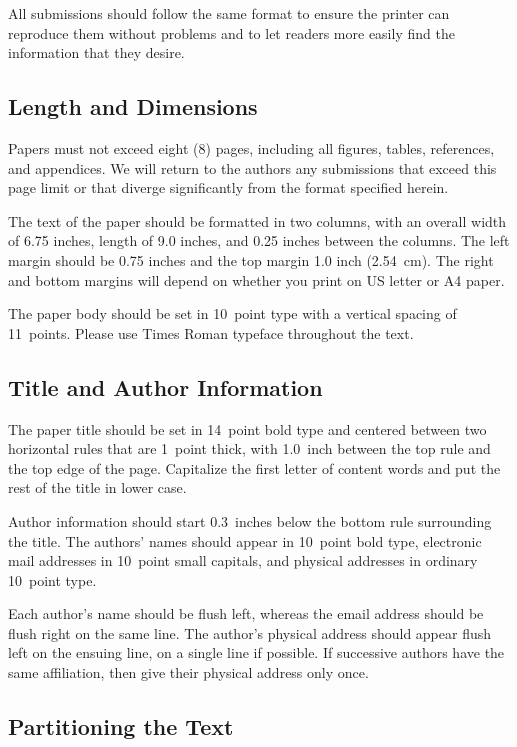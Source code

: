 All submissions should follow the same format to ensure the printer
can reproduce them without problems and to let readers more easily
find the information that they desire. 

\subsection{Length and Dimensions}

Papers must not exceed eight (8) pages, including all figures, tables, 
references, and appendices. We will return to the authors any submissions
that exceed this page limit or that diverge significantly from the format 
specified herein.

The text of the paper should be formatted in two columns, with an
overall width of 6.75 inches, length of 9.0 inches, and 0.25 inches
between the columns. The left margin should be 0.75 inches and the top
margin 1.0 inch (2.54~cm). The right and bottom margins will depend on
whether you print on US letter or A4 paper. 

The paper body should be set in 10~point type with a vertical spacing of 
11~points. Please use Times Roman typeface throughout the text. 

\subsection{Title and Author Information}

The paper title should be set in 14~point bold type and centered between 
two horizontal rules that are 1~point thick, with 1.0~inch between the
top rule and the top edge of the page. Capitalize the first letter of 
content words and put the rest of the title in lower case. 

Author information should start 0.3~inches below the bottom rule
surrounding the title. The authors' names should appear in 10~point 
bold type, electronic mail addresses in 10~point small capitals, and
physical addresses in ordinary 10~point type.

Each author's name should be flush left, whereas the email address
should be flush right on the same line. The author's physical address
should appear flush left on the ensuing line, on a single line if
possible. If successive authors have the same affiliation, then give
their physical address only once.

\subsection{Partitioning the Text} 

